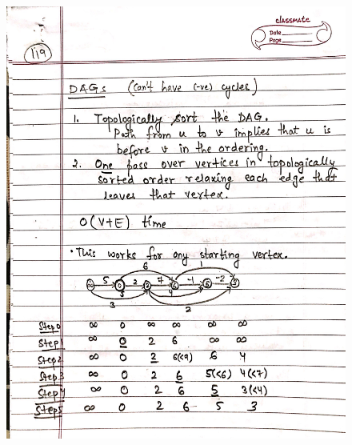 \begin{figure}[H]
    \centering
    \includegraphics[width=16cm, height=21cm]{"./MIT-6.006/MIT-6006-119"}
\end{figure}
\newpage
